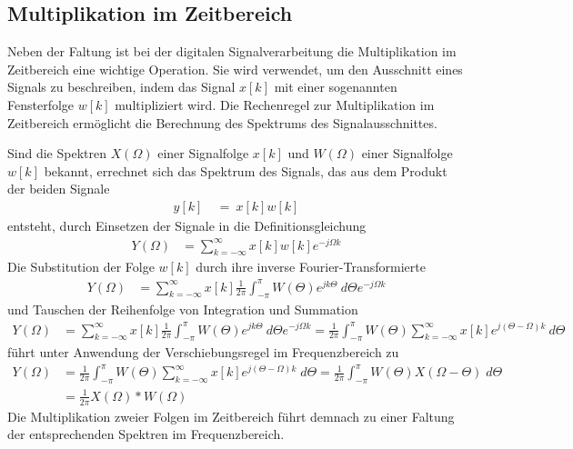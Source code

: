 \subsection{Multiplikation im Zeitbereich}\label{sec:7.2.9}

Neben der Faltung ist bei der digitalen Signalverarbeitung die Multiplikation im Zeitbereich eine wichtige Operation. Sie wird verwendet, um den Ausschnitt eines Signals zu beschreiben, indem das Signal \(x[k]\) mit einer sogenannten Fensterfolge \(w[k]\) multipliziert wird. Die Rechenregel zur Multiplikation im Zeitbereich ermöglicht die Berechnung des Spektrums des Signalausschnittes.

Sind die Spektren \(X(Ω)\) einer Signalfolge \(x[k]\) und \(W(Ω)\) einer Signalfolge \(w[k]\) bekannt, errechnet sich das Spektrum des Signals, das aus dem Produkt der beiden Signale
\begin{align}
y[ k]\  &= \ x[ k]  w[ k] \label{eq:7.77}
\end{align}
entsteht, durch Einsetzen der Signale in die Definitionsgleichung
\begin{align}
Y(\Omega) &= \sum\limits_{k = - \infty}^{\infty}{x[ k]  w[ k]}  e^{- j  \Omega  k} \label{eq:7.78}
\end{align}
Die Substitution der Folge \(w[k]\) durch ihre inverse Fourier-Transformierte
\begin{align}
Y(\Omega) &= \sum\limits_{k = - \infty}^{\infty}{x[ k]  \frac{1}{2  \pi}  \int_{- \pi}^{\pi}{W(\Theta)  e^{j  k  \Theta}\ d\Theta}}  e^{- j  \Omega  k} \label{eq:7.79}
\end{align}
und Tauschen der Reihenfolge von Integration und Summation
\begin{align}
Y(\Omega) &= \sum\limits_{k = - \infty}^{\infty}{x[ k]  \frac{1}{2  \pi}  \int_{- \pi}^{\pi}{W(\Theta)  e^{j  k  \Theta}\ d\Theta}}  e^{- j  \Omega  k} = \frac{1}{2  \pi}  \int_{- \pi}^{\pi}{W(\Theta)  \sum\limits_{k = - \infty}^{\infty}{x[ k]  e^{j  (\Theta - \Omega)  k}\ }d\Theta} \label{eq:7.80}
\end{align}
führt unter Anwendung der Verschiebungsregel im Frequenzbereich zu
\begin{align}
{Y\left(\Omega \right)} &=  {\frac{1}{2 \pi }  \int _{-\pi }^{\pi }W\left(\Theta \right) \sum\limits _{k=-\infty }^{\infty }x\left[k\right] e^{j \left(\Theta -\Omega \right) k} {\; } d\Theta  =\frac{1}{2 \pi }  \int _{-\pi }^{\pi }W\left(\Theta \right) X\left(\Omega -\Theta \right){\; }d\Theta  } \\
{} &=  {\frac{1}{2 \pi }  X\left(\Omega \right)*W\left(\Omega \right)}
\label{eq:7.81}
\end{align}
Die Multiplikation zweier Folgen im Zeitbereich führt demnach zu einer Faltung der entsprechenden Spektren im Frequenzbereich.

